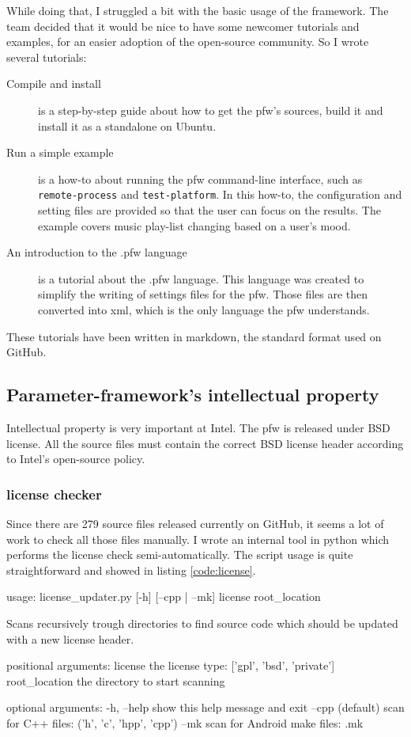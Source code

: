 While doing that, I struggled a bit with the basic usage of the framework. The
team decided that it would be nice to have some newcomer tutorials and examples,
for an easier adoption of the open-source community. So I wrote several
tutorials:
\begin{description}
    \item[Compile and install]
        is a step-by-step guide about how to get the \gls{pfw}'s sources,
        build it and install it as a standalone on Ubuntu.
    \item[Run a simple example]
        is a how-to about running the \gls{pfw} command-line interface,
        such as \lstinline{remote-process} and \lstinline {test-platform}.  In
        this how-to, the configuration and setting files are provided so that
        the user can focus on the results. The example covers music play-list
        changing based on a user's mood.
    \item[An introduction to the .pfw language]\label{desc:pfw-language}
        is a tutorial about the .pfw language. This language was
        created to simplify the writing of settings files for the
        \gls{pfw}. Those files are then converted into \gls{xml}, which is
        the only language the \gls{pfw} understands.
\end{description}
These tutorials have been written in \gls{markdown}, the standard format used
on \gls{GitHub}.

\subsection{Parameter-framework's intellectual property}
Intellectual property is very important at Intel. The \gls{pfw} is released under
BSD license. All the source files must contain the correct BSD license header according
to Intel's open-source policy.

\subsubsection{license checker}
Since there are 279 source files released currently on \gls{GitHub}, it seems a lot of
work to check all those files manually.
I wrote an internal tool in \gls{python} which performs the license check semi-automatically.
The script usage is quite straightforward and showed in listing \ref{code:license}.

\begin{code}[language=bash, caption=License checker usage, label=code:license]
usage: license_updater.py [-h] [--cpp | --mk] license root_location

Scans recursively trough directories to find source code which should be
updated with a new license header.

positional arguments:
    license        the license type: ['gpl', 'bsd', 'private']
    root_location  the directory to start scanning

optional arguments:
    -h, --help     show this help message and exit
    --cpp          (default) scan for C++ files: ('h', 'c', 'hpp', 'cpp')
    --mk           scan for Android make files: .mk
\end{code}


